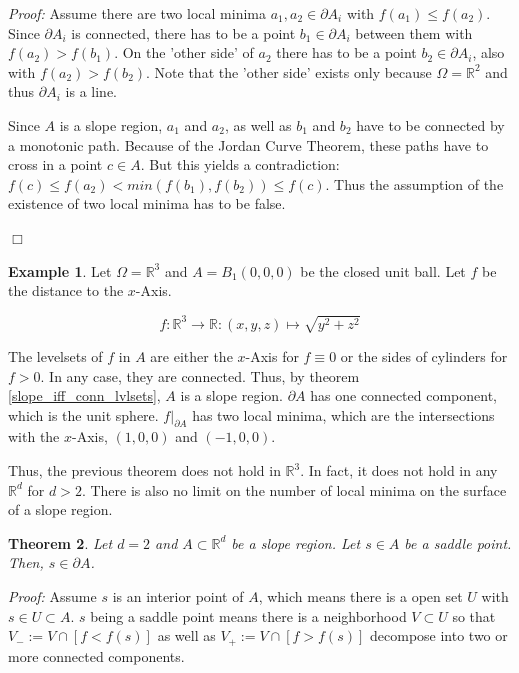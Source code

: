 \documentclass[a4paper,12pt,notitlepage,fullpage]{paper}
\theoremstyle{plain}
\newtheorem{thm}{Theorem}[section] %
\theoremstyle{definition}
\newtheorem{exmp}[thm]{Example} %
\begin{document}
\emph{Proof:} Assume there are two local minima $a_1, a_2 \in \partial A_i$ with $f(a_1) \leq f(a_2)$.
Since $\partial A_i$ is connected, there has to be a point $b_1 \in \partial A_i$ between them with $f(a_2) > f(b_1)$.
On the 'other side' of $a_2$ there has to be a point $b_2 \in \partial A_i$, also with $f(a_2) > f(b_2)$.
Note that the 'other side' exists only because $\Omega = \mathbb R^2$ and thus $\partial A_i$ is a line.

Since $A$ is a slope region, $a_1$ and $a_2$, as well as $b_1$ and $b_2$ have to be connected by a monotonic path.
Because of the Jordan Curve Theorem, these paths have to cross in a point $c \in A$.
But this yields a contradiction: $f(c) \leq f(a_2) < min(f(b_1), f(b_2)) \leq f(c)$.
Thus the assumption of the existence of two local minima has to be false.

\hfill $\Box$

\begin{exmp}
Let $\Omega = \mathbb R^3$ and $A = B_1(0,0,0)$ be the closed unit ball.
Let $f$ be the distance to the $x$-Axis. 

\begin{equation*}
f: \mathbb R^3 \to \mathbb R: (x,y,z) \mapsto \sqrt{y^2 + z^2}
\end{equation*}

The levelsets of $f$ in $A$ are either the $x$-Axis for $f \equiv 0$ or the sides of cylinders for $f > 0$.
In any case, they are connected.
Thus, by theorem \ref{slope_iff_conn_lvlsets}, $A$ is a slope region.
$\partial A$ has one connected component, which is the unit sphere.
$f|_{\partial A}$ has two local minima, which are the intersections with the $x$-Axis, $(1,0,0)$ and $(-1,0,0)$.
\end{exmp}

Thus, the previous theorem does not hold in $\mathbb R^3$.
In fact, it does not hold in any $\mathbb R^d$ for $d > 2$.
There is also no limit on the number of local minima on the surface of a slope region.

\begin{thm}
\label{thm:saddle_on_border}
Let $d = 2$ and $A \subset \mathbb R^d$ be a slope region.
Let $s \in A$ be a saddle point.
Then, $s \in \partial A$.
\end{thm}

\emph{Proof:} Assume $s$ is an interior point of $A$, which means there is a open set $U$ with $s \in U \subset A$.
$s$ being a saddle point means there is a neighborhood $V \subset U$ so that $V_- := V \cap [f < f(s)]$ as well as $V_+ := V \cap [f > f(s)]$ decompose into two or more connected components.
\end{document}
